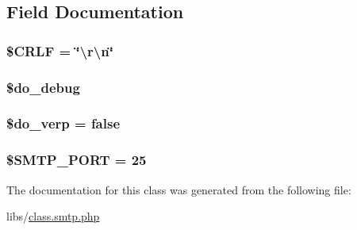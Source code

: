 \subsection{Field Documentation}
\hypertarget{class_s_m_t_p_a75538b15bafd1ec1eaaa6ea0bbfa642a}{}
\subsubsection[{\$\+C\+R\+L\+F}]{\setlength{\rightskip}{0pt plus 5cm}\$C\+R\+L\+F = \char`\"{}\textbackslash{}r\textbackslash{}n\char`\"{}}\label{class_s_m_t_p_a75538b15bafd1ec1eaaa6ea0bbfa642a}
\hypertarget{class_s_m_t_p_a09ca59ee83fba6c8137646a13f1664d1}{}
\subsubsection[{\$do\+\_\+debug}]{\setlength{\rightskip}{0pt plus 5cm}\$do\+\_\+debug}\label{class_s_m_t_p_a09ca59ee83fba6c8137646a13f1664d1}
\hypertarget{class_s_m_t_p_abf2ec34ae2e6abd0f598ea202a8fa807}{}
\subsubsection[{\$do\+\_\+verp}]{\setlength{\rightskip}{0pt plus 5cm}\$do\+\_\+verp = false}\label{class_s_m_t_p_abf2ec34ae2e6abd0f598ea202a8fa807}
\hypertarget{class_s_m_t_p_ae1e172b1b60aa3a8f2385012966200da}{}
\subsubsection[{\$\+S\+M\+T\+P\+\_\+\+P\+O\+R\+T}]{\setlength{\rightskip}{0pt plus 5cm}\$S\+M\+T\+P\+\_\+\+P\+O\+R\+T = 25}\label{class_s_m_t_p_ae1e172b1b60aa3a8f2385012966200da}


The documentation for this class was generated from the following file\+:\begin{DoxyCompactItemize}
\item 
libs/\hyperlink{class_8smtp_8php}{class.\+smtp.\+php}\end{DoxyCompactItemize}
